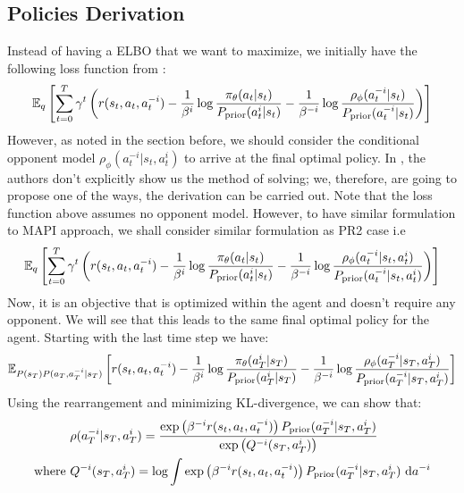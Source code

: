 \label{sec:chap3-balancing-Q}

\subsection{Policies Derivation}
\label{sec:chap3-balancing-Q-derivation}
Instead of having a ELBO that we want to maximize, we initially have the following loss function from \cite{grau2018balancing}:
\begin{equation}
    \mathbb{E}_q\left[ \sum^T_{t=0} \gamma^t \left( r(s_t, a_t, a^{-i}_t) - \frac{1}{\beta^i} \log\frac{\pi_{\theta}(a_t|s_t)}{P_{\text{prior}}(a^i_t|s_t)} - \frac{1}{\beta^{-i}}\log \frac{\rho_\phi(a^{-i}_t|s_t)}{P_{\text{prior}}(a^{-i}_t|s_t)} \right) \right]
\end{equation}
However, as noted in the section before, we should consider the conditional opponent model $\rho_\phi(a^{-i}_t | s_t, a^i_t)$ to arrive at the final optimal policy. In \cite{grau2018balancing}, the authors don't explicitly show us the method of solving; we, therefore, are going to propose one of the ways, the derivation can be carried out. Note that the loss function above assumes no opponent model. However, to have similar formulation to MAPI approach, we shall consider similar formulation as PR2 \cite{wen2019probabilistic} case i.e 
\begin{equation}
    \mathbb{E}_q\left[ \sum^T_{t=0} \gamma^t \left( r(s_t, a_t, a^{-i}_t) - \frac{1}{\beta^i} \log\frac{\pi_{\theta}(a_t|s_t)}{P_{\text{prior}}(a^i_t|s_t)} - \frac{1}{\beta^{-i}}\log \frac{\rho_\phi(a^{-i}_t | s_t, a^i_t)}{P_{\text{prior}}(a^{-i}_t | s_t, a^i_t)} \right) \right]
\end{equation}
Now, it is an objective that is optimized within the agent and doesn't require any opponent. We will see that this leads to the same final optimal policy for the agent. Starting with the last time step we have:
\begin{equation}
    \mathbb{E}_{P(s_T) P(a_T, a^{-i}_T | s_T)}\left[ r(s_t, a_t, a^{-i}_t) - \frac{1}{\beta^i} \log\frac{\pi_{\theta}(a^i_T|s_T)}{P_{\text{prior}}(a^i_T|s_T)} - \frac{1}{\beta^{-i}}\log \frac{\rho_\phi(a^{-i}_T|s_T, a^i_T)}{P_{\text{prior}}(a^{-i}_T|s_T, a^i_T)} \right]
\end{equation}
Using the rearrangement and minimizing KL-divergence, we can show that:
\begin{equation}
\begin{aligned}
    &\rho(a^{-i}_T | s_T, a^i_T) = \frac{ \exp\left( \beta^{-i} r(s_t, a_t, a^{-i}_t) \right) P_{\text{prior}}(a^{-i}_T|s_T, a^i_T)}{\exp\left( Q^{-i}(s_T, a^{i}_T) \right)}\\
    \text{where }& Q^{-i}(s_T, a^{i}_T) = \log \int \exp\left( \beta^{-i} r(s_t, a_t, a^{-i}_t) \right) P_{\text{prior}}(a^{-i}_T|s_T, a^i_T) \ \mathrm{d} a^{-i}
\end{aligned}
\end{equation}
